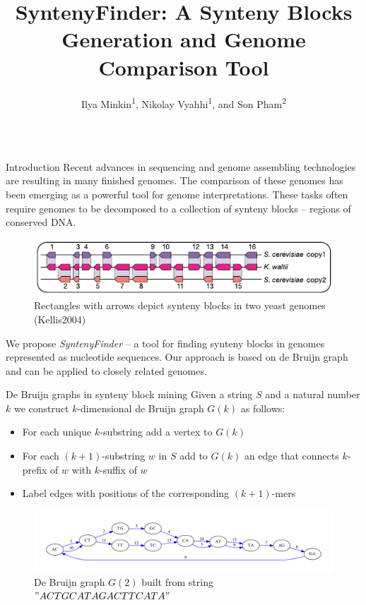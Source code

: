 \documentclass[final,hyperref={pdfpagelabels=false}]{beamer}
\title{SyntenyFinder: A Synteny Blocks Generation and Genome Comparison Tool}
\author{Ilya Minkin\textsuperscript{1}, Nikolay Vyahhi\textsuperscript{1}, and Son Pham\textsuperscript{2}}
\institute{\textsuperscript{1} St. Petersburg Academic University, St. Petersburg, Russia \\ \textsuperscript{2} University of California, San Diego, USA}
\begin{document}
\begin{frame}{}

\begin{columns}[t]

\begin{column}{0.32\linewidth}

\begin{block}{Introduction} \justifying
Recent advances in sequencing and genome assembling technologies are resulting in many finished genomes.
The comparison of these genomes has been emerging as a powerful tool for genome interpretations.
These tasks often require genomes to be  decomposed to a collection of synteny blocks -- regions of conserved DNA.
\begin{figure}
	\centering
	\includegraphics[scale = 2.8]{syntenyBlocks.pdf}
	\small \caption{Rectangles with arrows depict synteny blocks in two yeast genomes (Kellis2004)}
\end{figure}
We propose \textit{SyntenyFinder} -- a tool for finding synteny blocks in genomes represented as nucleotide sequences.
Our approach is based on de Bruijn graph and can be applied to closely related genomes.
\end{block}

\begin{block}{De Bruijn graphs in synteny block mining} \justifying
Given a string \(S\) and a natural number \(k\) we construct \(k\)-dimensional de Bruijn graph \(G(k)\) as follows:

\begin{itemize}
\item For each unique \(k\)-substring add a vertex to \(G(k)\)
\item For each \((k + 1)\)-substring \(w\) in \(S\) add to \(G(k)\) an edge that connects \(k\)-prefix of \(w\) with \(k\)-suffix of \(w\)
\item Label edges with positions of the corresponding \((k + 1)\)-mers
\end{itemize}

\begin{figure}
	\centering
	\includegraphics[scale = 0.78]{simpleGraph.pdf}
	\small \caption{De Bruijn graph \(G(2)\) built from string \("ACTGCATAGACTTCATA"\)}
\end{figure}


\end{block}
\end{column}
\end{columns}
\end{frame}
\end{document}
